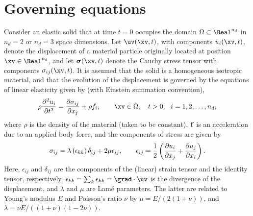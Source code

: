 \documentclass[11pt]{article}
\begin{document}
\section{Governing equations} \label{sec:governing}



Consider an elastic solid that at time $t=0$ occupies the domain $\Omega \subset \Real^{\nd}$ in $n_d=2$ or
$n_d=3$ space dimensions. 
Let $\uv(\xv,t)$, with components $u_i(\xv,t)$,
denote the displacement of a material particle originally located at position $\xv\in\Real^\nd$,
and let $\sigmav(\xv,t)$ denote the 
Cauchy stress tensor with components $\sigma_{ij}(\xv,t)$. 
It is assumed that the solid is a homogeneous isotropic material, and
that the evolution of the displacement is governed by the equations of linear elasticity given
by (with Einstein summation convention), 
\begin{equation}
\rho{\partial\sp2u_i\over\partial t\sp2}={\partial\s_{ij}\over\partial x_j}+\rho f_i,
           \qquad \xv\in\Omega,\quad t>0,~~ i=1,2,\ldots,\nd,
\label{eq:sm}
\end{equation}
where $\rho$ is the density of the material (taken to be constant), ${\bf f}$ is an acceleration due
to an applied body force, and the components of stress are given by
\begin{equation}
{\sigma}_{ij}=\lambda\left(\epsilon_{kk}\right)\delta_{ij}+2\mu\epsilon_{ij},\qquad \epsilon_{ij}={1\over2}\left({\partial u_i\over\partial x_j}+{\partial u_j\over\partial x_i}\right).
\label{eq:stress}
\end{equation}
Here, $\epsilon_{ij}$ and $\delta_{ij}$ are the components of the (linear) strain tensor and the identity tensor, respectively, $\epsilon_{kk}=\sum_k \epsilon_{kk}=\grad\cdot\uv$ is the divergence of the displacement, 
and $\lambda$ and $\mu$ are Lam\'e parameters.  The latter are related to
Young's modulus $E$ and Poisson's ratio $\nu$ by $\mu={E/(2(1+\nu))}$, and $\lambda={\nu E/((1+\nu)(1-2\nu))}$.
\end{document}
